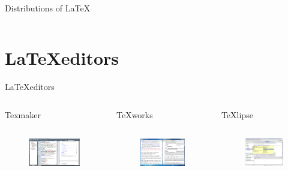 \documentclass{beamer}
\begin{document}
\begin{frame}{Distributions of \LaTeX}
\begin{columns}[t]
\begin{column}[T]{5cm}
     \end{column}
     \end{columns} 
         
\end{frame}


\section{\LaTeX editors}

\begin{frame}{\LaTeX  editors}
\centering
     \begin{columns}[t]
     \begin{column}[T]{3cm}
      \centering Texmaker 
      \begin{figure} 
     \includegraphics[height=2cm,trim = 0mm 0mm 00mm 0mm]{../figs/texmaker.png} 
     \end{figure}     
     \end{column}
     \begin{column}[T]{3cm} %
      \centering TeXworks
       \begin{figure}
     \includegraphics[height=2cm,trim = 0mm 0mm 00mm 0mm]{../figs/TeXworks.png}  
      \end{figure}       
     \end{column}
     \begin{column}[T]{3cm} %
      \centering TeXlipse 
      \begin{figure} 
      \includegraphics[height=2cm,trim = 0mm 20mm 0mm 0mm]{../figs/TexLipse.png}
      \end{figure}         
     \end{column}
     \end{columns} 
         
\end{frame}
\end{document}
